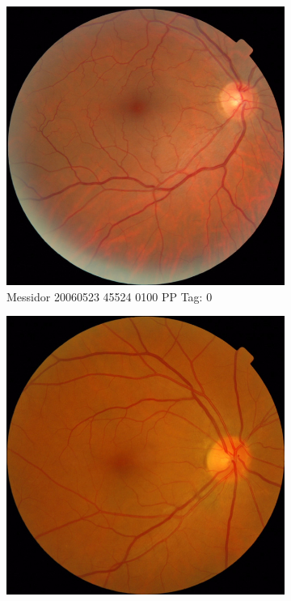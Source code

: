 \begin{figure}[ht!]
\begin{subfigure}[b]{0.4\textwidth}
		\includegraphics[width=\textwidth]{Figures/chapter_stability/20060523_45524_0100_PP/20060523_45524_0100_PP.jpeg}
		\caption{Messidor 20060523 45524 0100 PP Tag: 0}		
	\end{subfigure}	
	\begin{subfigure}[b]{0.4\textwidth}
		\centering
		\includegraphics[width=\textwidth]{Figures/chapter_stability/20060523_48709_0100_PP/20060523_48709_0100_PP.jpeg}

\end{subfigure}
\end{figure}
